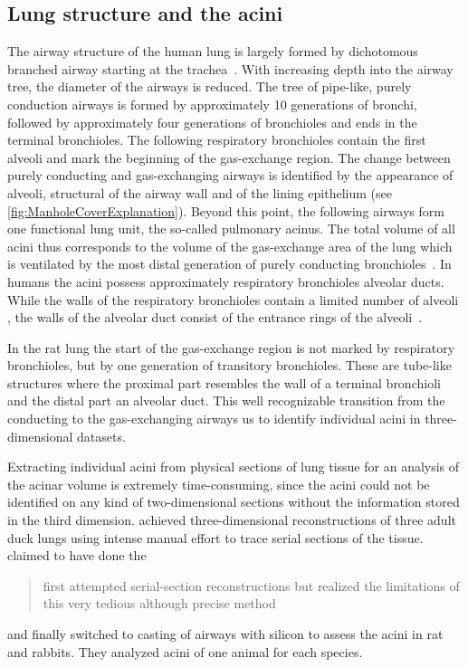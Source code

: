 \documentclass[final,paper=a4,DIV=calc,abstract,english]{scrartcl}
\begin{document}
\subsection{Lung structure and the acini}
The airway structure of the human lung is largely formed by dichotomous branched airway starting at the trachea~\citep{Weibel1991}.
With increasing depth into the airway tree, the diameter of the airways is reduced.
The tree of pipe-like, purely conduction airways is formed by approximately 10 generations of bronchi, followed by approximately four generations of bronchioles and ends in the terminal bronchioles.
The following respiratory bronchioles contain the first alveoli and mark the beginning of the gas-exchange region.
The change between purely conducting and gas-exchanging airways is identified by the appearance of alveoli, structural  of the airway wall and of the lining epithelium (see \autoref{fig:ManholeCoverExplanation}).
Beyond this point, the following airways form one functional lung unit, the so-called pulmonary acinus.
The total volume of all acini thus corresponds to the volume of the gas-exchange area of the lung which is ventilated by the most distal generation of purely conducting bronchioles~\citep{Rodriguez1987}.
In humans the acini possess approximately  respiratory bronchioles  alveolar ducts.
While the walls of the respiratory bronchioles contain a limited number of alveoli , the walls of the alveolar duct  consist of the entrance rings of the alveoli~\citep{Schittny2007}.

In the rat lung the start of the gas-exchange region is not marked by respiratory bronchioles, but by one generation of transitory bronchioles.
These are tube-like structures where the proximal part resembles the wall of a terminal bronchioli and the distal part an alveolar duct.
This well recognizable transition from the conducting to the gas-exchanging airways  us to identify individual acini in three-dimensional datasets.

Extracting individual acini from physical sections of lung tissue for an analysis of the acinar volume is extremely time-consuming, since the acini could not be identified on any kind of two-dimensional sections without the information stored in the third dimension.
\citet{Woodward2005} achieved three-dimensional reconstructions of three adult duck lungs using intense manual effort to trace serial sections of the tissue.
\citet{Rodriguez1987} claimed to have done the \blockquote{first attempted serial-section reconstructions but realized the limitations of this very tedious although precise method} and finally switched to casting of airways with silicon to assess the acini in rat and rabbits.
They analyzed acini of one animal for each species.
\end{document}
